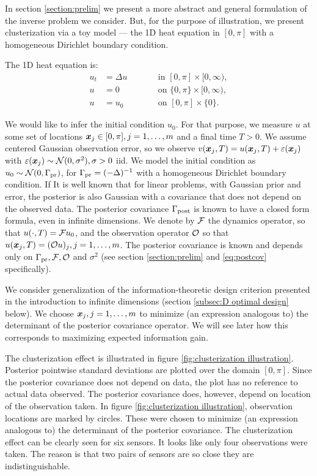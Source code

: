 \documentclass{amsart}
\numberwithin{equation}{section}
\begin{document}
In section \ref{section:prelim} we present a more abstract and general
formulation of the inverse problem we consider. But, for the purpose
of illustration, we present clusterization via a toy model --- the 1D
heat equation in $[0,\pi]$ with a homogeneous Dirichlet boundary
condition.

The 1D heat equation is:
\begin{subequations}\label{eq:heat equation}
  \begin{alignat}{2}
    u_t &= \Delta u &&\qquad \text{in } [0,\pi] \times [0,\infty),\\
      u &= 0 &&\qquad \text{on } \{0, \pi\} \times [0,\infty),\\
        u &= u_0 &&\qquad \text{on }[0,\pi] \times \{0\}.
  \end{alignat}
\end{subequations}

We would like to infer the initial condition $u_0$. For that purpose,
we measure $u$ at some set of locations ${\boldsymbol{x}}_j \in [0,\pi], j=1,
\dots,m$ and a final time $T > 0$. We assume centered Gaussian
observation error, so we observe $v({\boldsymbol{x}}_j,T) = u({\boldsymbol{x}}_j,T) + \varepsilon({\boldsymbol{x}}_j)$
with $\varepsilon({\boldsymbol{x}}_j) \sim \mathcal{N}(0, \sigma^2), \sigma > 0$ iid. We model
the initial condition as $u_0 \sim \mathcal{N}(0,\Gamma_{\textup{pr}})$, for $\Gamma_{\textup{pr}} =
(-\Delta)^{-1}$ with a homogeneous Dirichlet boundary condition. If It
is well known \cite{Tarantola05} that for linear problems, with
Gaussian prior and error, the posterior is also Gaussian with a
covariance that does not depend on the observed data. The posterior
covariance $\Gamma_{\textup{post}}$ is known to have a closed form formula, even in
infinite dimensions\cite{Stuart10}. We denote by $\mathcal{F}$ the dynamics
operator, so that $u( \cdot,T) = \mathcal{F} u_0$, and the observation
operator $\mathcal{O}$ so that $u({\boldsymbol{x}}_j,T) = (\mathcal{O} u)_j, j=1,\dots,m$. The
posterior covariance is known and depends only on $\Gamma_{\textup{pr}}, \mathcal{F}, \mathcal{O}$
and $\sigma^2$ (see section \ref{section:prelim} and
\eqref{eq:postcov} specifically).

We consider generalization of the information-theoretic design
criterion presented in the introduction to infinite dimensions
(section \ref{subsec:D optimal design} below). We choose
${\boldsymbol{x}}_j,j=1,\dots,m$ to minimize (an expression analogous to) the
determinant of the posterior covariance operator. We will see later
how this corresponds to maximizing expected information gain.

The clusterization effect is illustrated in figure
\ref{fig:clusterization illustration}. Posterior pointwise standard
deviations are plotted over the domain $[0, \pi]$. Since the posterior
covariance does not depend on data, the plot has no reference to
actual data observed. The posterior covariance does, however, depend
on location of the observation taken. In figure
\ref{fig:clusterization illustration}, observation locations are
marked by circles. These were chosen to minimize (an expression
analogous to) the determinant of the posterior covariance. The
clusterization effect can be clearly seen for six sensors. It looks
like only four observations were taken. The reason is that two pairs
of sensors are so close they are indistinguishable.
\end{document}
